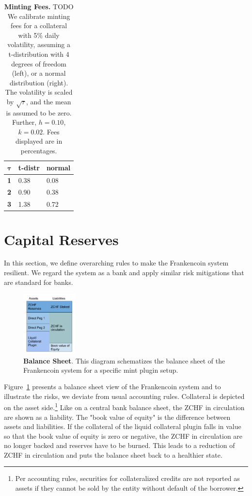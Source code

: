 \documentclass[english,11pt]{article}
\begin{document}
\begin{table}[]
\caption{\textbf{Minting Fees.}
    TODO We calibrate minting fees for a collateral with 5\% daily volatility,
    assuming a t-distribution with 4 degrees of freedom (left), or a normal
    distribution (right). The volatility is scaled by $\sqrt{\tau}$, and the
    mean is assumed to be zero. Further, $h=0.10$, $k=0.02$. Fees displayed are in percentages.} %
	\begin{center}
	\begin{tabular}{lll}
	\hline
	\textbf{$\mathbf{\tau}$} & \textbf{t-distr} & \textbf{normal} \\
	\hline
	\textbf{1}                   & 0.38             & 0.08            \\
	\textbf{2}                   & 0.90             & 0.38            \\
	\textbf{3}                   & 1.38             & 0.72   \\        
	\hline
	\end{tabular}
	\label{tab:calibration}
	\end{center}
\end{table}

\section{Capital Reserves}
In this section, we define overarching rules to make the Frankencoin system
resilient. We regard the system as a bank and apply similar risk mitigations
that are standard for banks.

\begin{figure}[h]
    \center
    \includegraphics[width=0.25\textwidth]{FCBalanceSheet.pdf}
    \caption{\textbf{Balance Sheet}. This diagram
    schematizes the balance sheet of the Frankencoin system for
    a specific mint plugin setup.}\label{fig:bs}
\end{figure}

Figure~\ref{fig:bs} presents a balance sheet view of the Frankencoin system
and to illustrate the risks, we deviate from usual accounting rules.
Collateral is depicted on the asset side.\footnote{Per accounting rules, 
securities for collateralized credits are not reported as assets
if they cannot be sold by the entity without default of the borrower.}
Like on a central bank balance sheet, the ZCHF in circulation are shown
as a liability. The "book value of equity" is the difference between assets
and liabilities. If the collateral of the liquid collateral plugin falls in value so that
the book value of equity is zero or negative, the ZCHF in circulation
are no longer backed and reserves have to be burned. This leads
to a reduction of ZCHF in circulation and puts the balance sheet back to
a healthier state.
\end{document}
